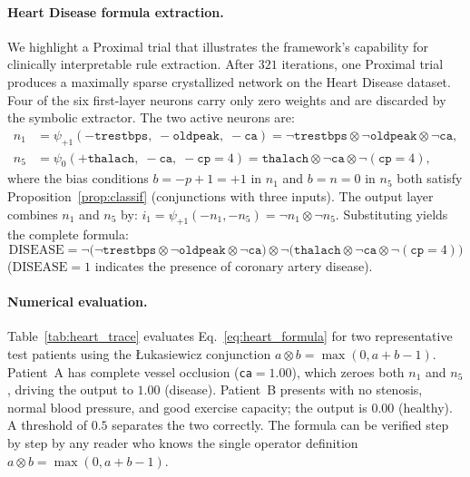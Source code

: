 \documentclass[12pt,a4paper]{article}
\newcommand{\tnorm}{\otimes}      %
\begin{document}
\paragraph{Heart Disease formula extraction.}
\label{ssec:heart}
We highlight a Proximal trial that illustrates the framework's capability for
clinically interpretable rule extraction.
After $321$ iterations, one Proximal trial produces a maximally sparse
crystallized network on the Heart Disease dataset.
Four of the six first-layer neurons carry only zero weights and are discarded
by the symbolic extractor.
The two active neurons are:
\begin{align}
  n_1 &= \psi_{+1}(-\mathtt{trestbps},\; -\mathtt{oldpeak},\; -\mathtt{ca})
       = \neg\mathtt{trestbps} \tnorm \neg\mathtt{oldpeak} \tnorm \neg\mathtt{ca},
       \label{eq:n1}\\
  n_5 &= \psi_{0}(+\mathtt{thalach},\; -\mathtt{ca},\; -\mathtt{cp}{=}4)
       = \mathtt{thalach} \tnorm \neg\mathtt{ca} \tnorm \neg(\mathtt{cp}{=}4),
       \label{eq:n5}
\end{align}
where the bias conditions $b = -p+1 = +1$ in $n_1$ and $b = n = 0$ in $n_5$
both satisfy Proposition~\ref{prop:classif} (conjunctions with three inputs).
The output layer combines $n_1$ and $n_5$ by:
$i_1 = \psi_{+1}(-n_1, -n_5) = \neg n_1 \tnorm \neg n_5$.
Substituting yields the complete formula:
\begin{equation}
  \boxed{
    \mathrm{DISEASE} =
    \neg\!\bigl(\neg\mathtt{trestbps} \tnorm \neg\mathtt{oldpeak}
                \tnorm \neg\mathtt{ca}\bigr)
    \tnorm
    \neg\!\bigl(\mathtt{thalach} \tnorm \neg\mathtt{ca}
                \tnorm \neg(\mathtt{cp}{=}4)\bigr)
  }
  \label{eq:heart_formula}
\end{equation}
($\mathrm{DISEASE} = 1$ indicates the presence of coronary artery disease).

\paragraph{Numerical evaluation.}
Table~\ref{tab:heart_trace} evaluates Eq.~\eqref{eq:heart_formula} for two
representative test patients using the \L{}ukasiewicz conjunction
$a \tnorm b = \max(0, a + b - 1)$.
Patient~A has complete vessel occlusion (\texttt{ca}$=1.00$), which zeroes
both $n_1$ and $n_5$, driving the output to $1.00$ (disease).
Patient~B presents with no stenosis, normal blood pressure, and good
exercise capacity; the output is $0.00$ (healthy).
A threshold of $0.5$ separates the two correctly.
The formula can be verified step by step by any reader who knows the single
operator definition $a \tnorm b = \max(0, a + b - 1)$.
\end{document}
